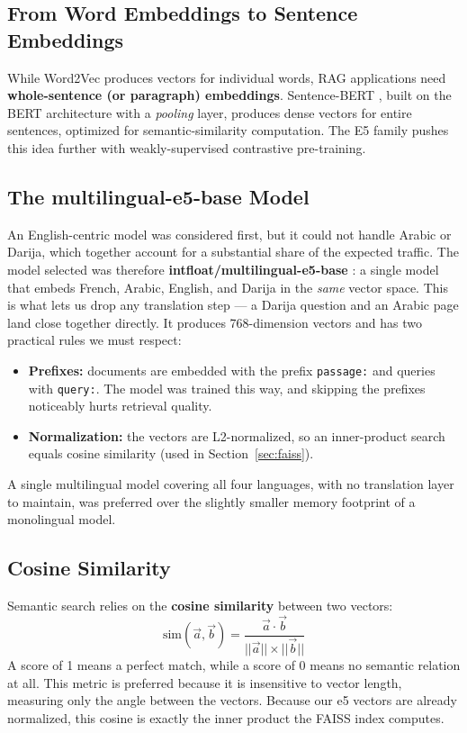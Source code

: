 \documentclass[12pt, a4paper]{report}
\newcommand{\sourced}[1]{#1}        %
\newcommand{\humantext}[1]{#1}      %
\begin{document}
\subsection{From Word Embeddings to Sentence Embeddings}
\sourced{While Word2Vec produces vectors for individual words, RAG applications need \textbf{whole-sentence (or paragraph) embeddings}. Sentence-BERT \cite{reimers2019sbert}, built on the BERT architecture with a \textit{pooling} layer, produces dense vectors for entire sentences, optimized for semantic-similarity computation. The E5 family \cite{wang2022e5} pushes this idea further with weakly-supervised contrastive pre-training.}

\subsection{The multilingual-e5-base Model}
\humantext{An English-centric model was considered first, but it could not handle Arabic or Darija, which together account for a substantial share of the expected traffic. The model selected was therefore \textbf{intfloat/multilingual-e5-base} \cite{wang2024me5}: a single model that embeds French, Arabic, English, and Darija in the \emph{same} vector space. This is what lets us drop any translation step --- a Darija question and an Arabic page land close together directly. It produces 768-dimension vectors and has two practical rules we must respect:}
\begin{itemize}[noitemsep]
    \item \humantext{\textbf{Prefixes:} documents are embedded with the prefix \texttt{passage:} and queries with \texttt{query:}. The model was trained this way, and skipping the prefixes noticeably hurts retrieval quality.}
    \item \humantext{\textbf{Normalization:} the vectors are L2-normalized, so an inner-product search equals cosine similarity (used in Section~\ref{sec:faiss}).}
\end{itemize}
\humantext{A single multilingual model covering all four languages, with no translation layer to maintain, was preferred over the slightly smaller memory footprint of a monolingual model.}

\subsection{Cosine Similarity}
\humantext{Semantic search relies on the \textbf{cosine similarity} between two vectors:}
\begin{equation}
    \text{sim}(\vec{a}, \vec{b}) = \frac{\vec{a} \cdot \vec{b}}{||\vec{a}|| \times ||\vec{b}||}
\end{equation}
\humantext{A score of 1 means a perfect match, while a score of 0 means no semantic relation at all. This metric is preferred because it is insensitive to vector length, measuring only the angle between the vectors. Because our e5 vectors are already normalized, this cosine is exactly the inner product the FAISS index computes.}
\end{document}
